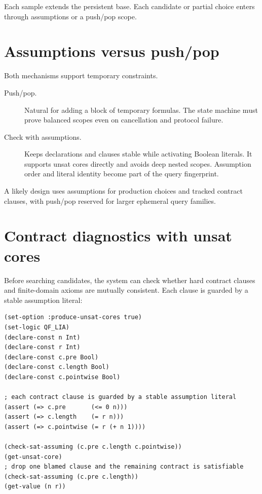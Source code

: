 \documentclass[10pt,letterpaper,oneside]{report}
\begin{document}
Each sample extends the persistent base. Each candidate or partial choice enters through assumptions or a push/pop scope.

\section{Assumptions versus push/pop}

Both mechanisms support temporary constraints.

\begin{description}
\item[Push/pop.] Natural for adding a block of temporary formulas. The state machine must prove balanced scopes even on cancellation and protocol failure.

\item[Check with assumptions.] Keeps declarations and clauses stable while activating Boolean literals. It supports unsat cores directly and avoids deep nested scopes. Assumption order and literal identity become part of the query fingerprint.
\end{description}

A likely design uses assumptions for production choices and tracked contract clauses, with push/pop reserved for larger ephemeral query families.

\section{Contract diagnostics with unsat cores}

Before searching candidates, the system can check whether hard contract clauses and finite-domain axioms are mutually consistent. Each clause is guarded by a stable assumption literal:

\begin{lstlisting}[language=SMTLib,caption={Tracked contract clauses. A contract author asked for length preservation and, by mistake, also for a pointwise clause that forces one extra element.}]
(set-option :produce-unsat-cores true)
(set-logic QF_LIA)
(declare-const n Int)
(declare-const r Int)
(declare-const c.pre Bool)
(declare-const c.length Bool)
(declare-const c.pointwise Bool)

; each contract clause is guarded by a stable assumption literal
(assert (=> c.pre       (<= 0 n)))
(assert (=> c.length    (= r n)))
(assert (=> c.pointwise (= r (+ n 1))))

(check-sat-assuming (c.pre c.length c.pointwise))
(get-unsat-core)
; drop one blamed clause and the remaining contract is satisfiable
(check-sat-assuming (c.pre c.length))
(get-value (n r))
\end{lstlisting}
\end{document}
